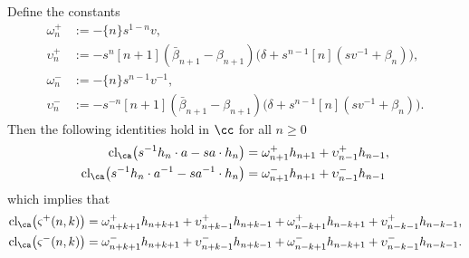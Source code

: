 \begin{lemma} \label{lemma:skewclosures}
Define the constants
\begin{align*}
\omega_{n}^+ &:= - \{n\} s^{1-n} v, \\
\upsilon_{n}^+ &:= - s^{n} [n+1] (\bar{\beta}_{n+1} - \beta_{n+1} ) \big( \delta + s^{n-1} [n] ( s v^{-1} + \beta_{n} ) \big), \\
\omega_{n}^- &:= -\{n\} s^{n-1} v^{-1}, \\
\upsilon_{n}^- &:= - s^{-n} [n+1] ( \bar{\beta}_{n+1} - \beta_{n+1} ) \big( \delta + s^{n-1} [n] ( s v^{-1} + \beta_{n} ) \big).
\end{align*}
Then the following identities hold in $\cc$ for all $n \geq 0$ 
\begin{align*}
\textrm{cl}_\ca \big( s^{-1} h_n \cdot a - s a \cdot h_n \big) &= \omega_{n+1}^+ h_{n+1} + \upsilon_{n-1}^+ h_{n-1}, \\
\textrm{cl}_\ca \big( s^{-1} h_n \cdot a^{-1} - s a^{-1} \cdot h_n \big) &= \omega_{n+1}^- h_{n+1} + \upsilon_{n-1}^- h_{n-1}
\end{align*}
which implies that
\begin{align*}
\textrm{cl}_\ca \big( \varsigma^+ (n, k) \big) &= \omega_{n+k+1}^+ h_{n+k+1} + \upsilon_{n+k-1}^+ h_{n+k-1} + \omega_{n-k+1}^+ h_{n-k+1} + \upsilon_{n-k-1}^+ h_{n-k-1}, \\
\textrm{cl}_\ca \big( \varsigma^- (n, k) \big) &= \omega_{n+k+1}^- h_{n+k+1} + \upsilon_{n+k-1}^- h_{n+k-1} + \omega_{n-k+1}^- h_{n-k+1} + \upsilon_{n-k-1}^- h_{n-k-1}.
\end{align*}
\end{lemma}
